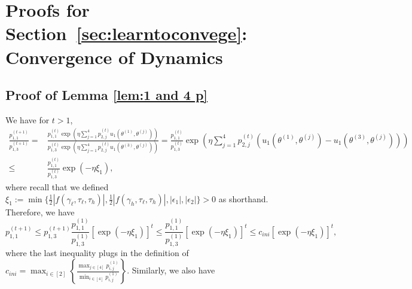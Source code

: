 


\section{Proofs for Section~\ref{sec:learntoconvege}: Convergence of Dynamics}



\subsection{Proof of Lemma \ref{lem:1 and 4 p}}
\label{proof:Lemma: converofp_1p_4}
We have for $t>1$,
\begin{equation*}
\begin{split}
    \frac{p^{(t+1)}_{1,1}}{p^{(t+1)}_{1,3}}  = {} & \frac{p^{(t)}_{1,1}\exp\left(\eta \sum_{j=1}^4 p_{2,j}^{(t)}u_1\left(\theta^{(1)},\theta^{(j)}\right) \right)}{p^{(t)}_{1,3}\exp\left(\eta \sum_{j=1}^4 p_{2,j}^{(t)}u_1\left(\theta^{(3)},\theta^{(j)}\right) \right)} = \frac{p_{1,1}^{(t)}}{p_{1,3}^{(t)}}\exp\left(\eta \sum_{j=1}^4p_{2,j}^{(t)}\left(u_1\left(\theta^{(1)},\theta^{(j)}\right)-u_1\left(\theta^{(3)},\theta^{(j)}\right)\right)\right) \\
\leq {} &  \frac{p_{1,1}^{(t)}}{p_{1,3}^{(t)}}\exp\left(-\eta\xi_1\right),
\end{split}
\end{equation*}
where recall that we defined $\xi_1 := \min\{\frac{1}{2}\left|f(\gamma_{\ell},\tau_{\ell},\tau_{h})\right|,\frac{1}{2}|f(\gamma_{h},\tau_{\ell},\tau_{h})|, |\epsilon_1|, |\epsilon_2|\}>0$ as shorthand.
Therefore, we have 
\[
{p^{(t+1)}_{1,1}}\leq p_{1,3}^{(t+1)} \frac{p^{(1)}_{1,1}}{p^{(1)}_{1,3}}\left[\exp\left(-\eta\xi_1\right)\right]^{t}\leq  \frac{p^{(1)}_{1,1}}{p^{(1)}_{1,3}}\left[\exp\left(-\eta\xi_1\right)\right]^{t}\leq c_{ini}\left[\exp\left(-\eta\xi_1\right)\right]^{t},
\]
where the last inequality plugs in the definition of $c_{ini}=\max_{i\in[2]}\left\{\frac{\max_{j\in[4]}p^{(1)}_{i,j}}{\min_{i\in[4]}p^{(1)}_{i,j}}\right\}$.
Similarly, we also have 


